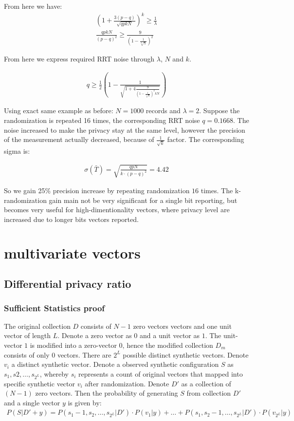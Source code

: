 \documentclass[11pt,draft]{article}
\begin{document}
From here we have:
\begin{align}
\left ( 1 + \frac{3(p-q)}{\sqrt{qpkN}} \right )^k  \ge \frac{1}{\lambda} \\
\frac{qpkN}{(p-q)^2} \ge  \frac{9}{(1 - \frac{1}{\sqrt[k]{\lambda}} )^2}
\end{align}

From here we express required RRT noise through $\lambda$, $N$ and $k$.

\begin{align}
q \ge \frac{1}{2} \left (1 -  \frac{1}{\sqrt{ 1 + 4 \frac{9}{(  1 - \frac{1}{\sqrt[k]{\lambda}} )^2kN} } } \right ) 
\end{align}

Using exact same example as before:  $N=1000$ records and $\lambda = 2$. Suppose the randomization is repeated 16 times, the corresponding RRT noise $q=0.1668$.
The noise increased to make the privacy stay at the same level, however the precision of the measurement actually decreased, because of $\frac{1}{\sqrt{k}}$ factor.
The corresponding sigma is:

\begin{align}
\sigma(\bar{T}) = \sqrt{\frac{qpN}{k \cdot (p-q)^2}}  = 4.42
\end{align}

So we gain 25\% precision increase by repeating randomization $16$ times.  The k-randomization gain main not be very significant for a single bit reporting, but becomes very useful for high-dimentionality vectors, where privacy level are increased due to longer bits vectors reported.

\section{multivariate vectors}

\subsection{Differential privacy ratio}

\subsubsection{Sufficient Statistics proof}

The original collection $D$ consists of $N-1$ zero vectors vectors and one unit vector of length $L$. 
Denote a zero vector as $0$ and a unit vector as $1$.  
The unit-vector $1$ is modified into a zero-vector $0$, hence the modified collection $D_m$ consists of only $0$ vectors.
There are $2^L$ possible distinct synthetic vectors.
Denote $v_i$ a distinct synthetic vector.
Denote a observed synthetic configuration $S$ as $s_1,s2,\dots,s_{2^L}$, 
whereby $s_i$ represents a count of original vectors that mapped into specific synthetic vector $v_i$ after randomization.
Denote $D'$ as a collection of $(N-1)$ zero vectors.
Then the probability of generating $S$ from collection $D'$ and a single vector $y$ is given by:
\begin{align}
P(S|D'+y) = P(s_1-1,s_2,\dots,s_{2^L}|D') \cdot P(v_1|y) + \dots + P(s_1,s_2-1,\dots,s_{2^L}|D') \cdot P(v_{2^L}|y) 
\end{align}
\end{document}
